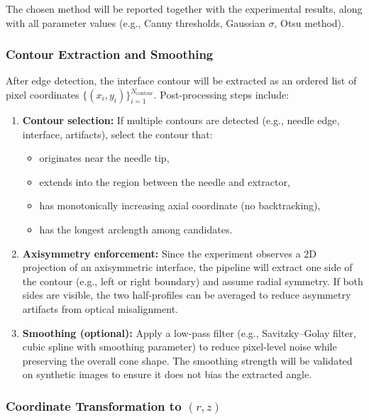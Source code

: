 The chosen method will be reported together with the experimental results, along with all parameter values (e.g., Canny thresholds, Gaussian $\sigma$, Otsu method).

\subsubsection{Contour Extraction and Smoothing}

After edge detection, the interface contour will be extracted as an ordered list of pixel coordinates $\{(x_i, y_i)\}_{i=1}^{N_{\text{contour}}}$. Post-processing steps include:
\begin{enumerate}
    \item \textbf{Contour selection:} If multiple contours are detected (e.g., needle edge, interface, artifacts), select the contour that:
    \begin{itemize}
        \item originates near the needle tip,
        \item extends into the region between the needle and extractor,
        \item has monotonically increasing axial coordinate (no backtracking),
        \item has the longest arclength among candidates.
    \end{itemize}
    \item \textbf{Axisymmetry enforcement:} Since the experiment observes a 2D projection of an axisymmetric interface, the pipeline will extract one side of the contour (e.g., left or right boundary) and assume radial symmetry. If both sides are visible, the two half-profiles can be averaged to reduce asymmetry artifacts from optical misalignment.
    \item \textbf{Smoothing (optional):} Apply a low-pass filter (e.g., Savitzky--Golay filter, cubic spline with smoothing parameter) to reduce pixel-level noise while preserving the overall cone shape. The smoothing strength will be validated on synthetic images to ensure it does not bias the extracted angle.
\end{enumerate}

\subsubsection{Coordinate Transformation to $(r, z)$}

